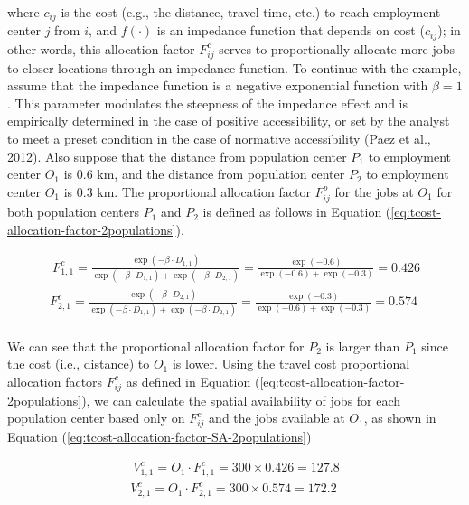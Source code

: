 \documentclass[]{elsarticle} %
\begin{document}
\noindent where \(c_{ij}\) is the cost (e.g., the distance, travel time,
etc.) to reach employment center \(j\) from \(i\), and \(f(\cdot)\) is
an impedance function that depends on cost (\(c_{ij}\)); in other words,
this allocation factor \(F^c_{ij}\) serves to proportionally allocate
more jobs to closer locations through an impedance function. To continue
with the example, assume that the impedance function is a negative
exponential function with \(\beta=1\). This parameter modulates the
steepness of the impedance effect and is empirically determined in the
case of positive accessibility, or set by the analyst to meet a preset
condition in the case of normative accessibility (Paez et al., 2012).
Also suppose that the distance from population center \(P_1\) to
employment center \(O_1\) is 0.6 km, and the distance from population
center \(P_2\) to employment center \(O_1\) is 0.3 km. The proportional
allocation factor \(F^p_{ij}\) for the jobs at \(O_1\) for both
population centers \(P_1\) and \(P_2\) is defined as follows in Equation
(\ref{eq:tcost-allocation-factor-2populations}).

\begin{equation}
\label{eq:tcost-allocation-factor-2populations}
\begin{array}{l}\
F^c_{1,1} = \frac{\exp(-\beta \cdot D_{1,1})}{\exp(-\beta \cdot D_{1,1}) + \exp(-\beta \cdot D_{2,1})} = \frac{\exp(-0.6)}{\exp(-0.6) + \exp(-0.3)} = 0.426\\
F^c_{2,1} = \frac{\exp(-\beta \cdot D_{2,1})}{\exp(-\beta \cdot D_{1,1}) + \exp(-\beta \cdot D_{2,1})}  = \frac{\exp(-0.3)}{\exp(-0.6) + \exp(-0.3)} = 0.574\\
\end{array}
\end{equation}

We can see that the proportional allocation factor for \(P_2\) is larger
than \(P_1\) since the cost (i.e., distance) to \(O_1\) is lower. Using
the travel cost proportional allocation factors \(F^c_{ij}\) as defined
in Equation (\ref{eq:tcost-allocation-factor-2populations}), we can
calculate the spatial availability of jobs for each population center
based only on \(F^c_{ij}\) and the jobs available at \(O_1\), as shown
in Equation (\ref{eq:tcost-allocation-factor-SA-2populations})

\begin{equation}
\label{eq:tcost-allocation-factor-SA-2populations}
\begin{array}{l}\
V^c_{1,1} = O_1 \cdot F^c_{1,1} = 300 \times 0.426 = 127.8\\
V^c_{2,1} = O_1 \cdot F^c_{2,1} = 300 \times  0.574 = 172.2\\
\end{array}
\end{equation}
\end{document}
